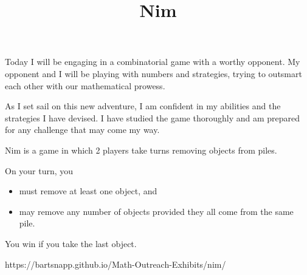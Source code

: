 \documentclass{../exhibit}
\title{Nim}
\begin{document}
\begin{context} Today I will be engaging in a combinatorial game with
a worthy opponent. My opponent and I will be playing with numbers and
strategies, trying to outsmart each other with our mathematical
prowess.

As I set sail on this new adventure, I am confident in my abilities
and the strategies I have devised. I have studied the game thoroughly
and am prepared for any challenge that may come my way.
\end{context}



\begin{directions}
  Nim is a game in which 2 players take turns removing objects from piles.

  On your turn, you
  \begin{itemize}
    \item must remove at least one object, and
    \item may remove any number of objects provided they all come from the same pile.
  \end{itemize}
  You win if you take the last object.
\end{directions}

\begin{example}
\end{example}

\begin{mathConnections}
  https://bartsnapp.github.io/Math-Outreach-Exhibits/nim/
\end{mathConnections}
\end{document}
